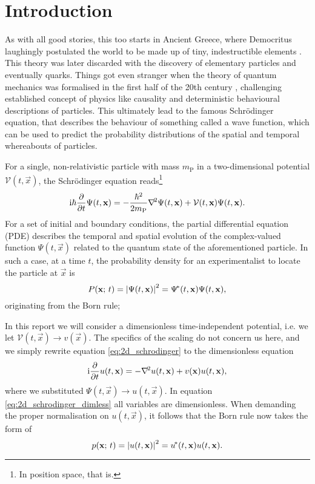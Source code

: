 \section{Introduction}\label{sec:introduction}

As with all good stories, this too starts in Ancient Greece, where Democritus laughingly postulated the world to be made up of tiny, indestructible elements \citep{berryman_2016}. This theory was later discarded with the discovery of elementary particles and eventually quarks. Things got even stranger when the theory of quantum mechanics was formalised in the first half of the 20th century \citep{QMH}, challenging established concept of physics like causality and deterministic behavioural descriptions of particles. This ultimately lead to the famous Schrödinger equation, that describes the behaviour of something called a wave function, which can be used to predict the probability distributions of the spatial and temporal whereabouts of particles. 

For a single, non-relativistic particle with mass $m_\mathrm{P}$ in a two-dimensional potential $\mathcal{V}(t, \vec{x})$, the Schrödinger equation reads\footnote{In position space, that is.}
\begin{equation}\label{eq:2d_schrodinger}
    \mathrm{i} \hbar \pdv{}{t}\Psi(t, \mathbf{x}) = -\frac{\hbar^2}{2m_\mathrm{P}}\nabla^{\!2} \Psi(t, \mathbf{x})  + \mathcal{V}(t, \mathbf{x}) \Psi(t, \mathbf{x}).
\end{equation}
For a set of initial and boundary conditions, the partial differential equation (PDE) describes the temporal and spatial evolution of the complex-valued function $\Psi(t, \vec{x})$ related to the quantum state of the aforementioned particle. In such a case, at a time $t$, the probability density for an experimentalist to locate the particle at $\vec{x}$ is
\begin{equation}\label{eq:2d_bornrule}
    P(\mathbf{x}; \, t) = \abs{\Psi(t, \mathbf{x})}^2 = \Psi^{\!*}(t, \mathbf{x}) \Psi(t, \mathbf{x}),
\end{equation} 
originating from the Born rule; \sout{}

In this report we will consider a dimensionless time-independent potential, i.e. we let $\mathcal{V}(t, \vec{x}) \to v(\vec{x})$. The specifics of the scaling do not concern us here, and we simply rewrite equation \eqref{eq:2d_schrodinger} to the dimensionless equation
\begin{equation}\label{eq:2d_schrodinger_dimless}
    \mathrm{i} \pdv{}{t}u(t, \mathbf{x}) = - \nabla^{\!2}u(t, \mathbf{x})+ v(\mathbf{x})u(t, \mathbf{x}),
\end{equation}
where we substituted $\Psi(t, \vec{x}) \to u(t, \vec{x})$. In equation \eqref{eq:2d_schrodinger_dimless} all variables are dimensionless. When demanding the proper normalisation on $u(t,\vec{x})$, it follows that the Born rule now takes the form of
\begin{equation}\label{eq:2d_bornrule_dimless}
    p(\mathbf{x}; \, t) = \abs{u(t, \mathbf{x})}^2 = u^{\!*} (t, \mathbf{x})u(t, \mathbf{x}).
\end{equation}

